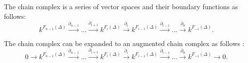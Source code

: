 \documentclass[11pt,a4paper,twoside, openright]{report}
\begin{document}
The chain complex is a series of vector spaces and their boundary functions as follows:
\begin{equation*}
k^{F_{n-1}(\Delta)}\overset{\partial_{n-1}}{\to}\dots\overset{\partial_{i+1}}{\to} k^{F_{i}(\Delta)}\overset{\partial_{i}}{\to}k^{F_{i-1}(\Delta)}\overset{\partial_{i-1}}{\to}\dots\overset{\partial_{0}}{\to} k^{F_{-1}(\Delta)}.
\end{equation*}

The chain complex can be expanded to an augmented chain complex as follows \cite{Allgaier}:
\begin{equation*}
0\to k^{F_{n-1}(\Delta)}\overset{\partial_{n-1}}{\to}\dots\overset{\partial_{i+1}}{\to} k^{F_{i}(\Delta)}\overset{\partial_{i}}{\to}k^{F_{i-1}(\Delta)}\overset{\partial_{i-1}}{\to}\dots\overset{\partial_{0}}{\to} k^{F_{-1}(\Delta)}\to 0.
\end{equation*}
\end{document}
